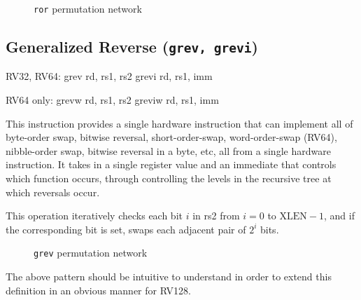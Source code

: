 
\begin{figure}[t]
\begin{center}

\end{center}
\caption{\texttt{ror} permutation network}
\label{permnet-ror}
\end{figure}

\subsection{Generalized Reverse (\texttt{grev,\ grevi})}
\label{grev}

\begin{rvb}
  RV32, RV64:
    grev  rd, rs1, rs2
    grevi rd, rs1, imm

  RV64 only:
    grevw  rd, rs1, rs2
    greviw rd, rs1, imm
\end{rvb}

This instruction provides a single hardware instruction that can implement all
of byte-order swap, bitwise reversal, short-order-swap, word-order-swap
(RV64), nibble-order swap, bitwise reversal in a byte, etc, all from a single
hardware instruction. It takes in a single register value and an immediate that
controls which function occurs, through controlling the levels in the recursive
tree at which reversals occur.

This operation iteratively checks each bit $i$ in rs2 from $i=0$ to
$\textrm{XLEN}-1$, and if the corresponding bit is set, swaps each adjacent
pair of $2^i$ bits.

\begin{figure}[t]
\begin{center}

\end{center}
\caption{\texttt{grev} permutation network}
\label{permnet-grev}
\end{figure}



The above pattern should be intuitive to understand in order to extend
this definition in an obvious manner for RV128.

